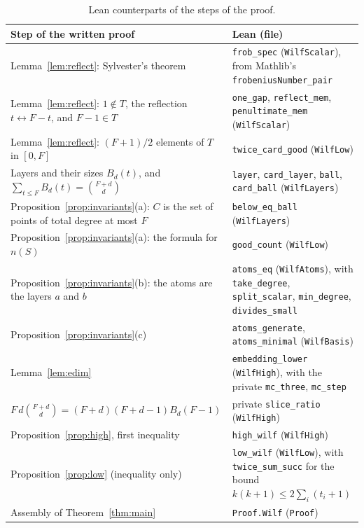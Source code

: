\documentclass[11pt]{article}
\theoremstyle{definition}
\theoremstyle{remark}
\newcommand{\Bd}[2]{B_{#1}(#2)}
\begin{document}
{\begin{table}[ht]
\centering\footnotesize
\renewcommand{\arraystretch}{1.18}
\begin{tabular}{@{}>{\raggedright\arraybackslash}p{}>{\raggedright\arraybackslash}p{}@{}}
\hline
Step of the written proof & Lean (file) \\
\hline
Lemma~\ref{lem:reflect}: Sylvester's theorem &
\texttt{frob\_spec} (\texttt{WilfScalar}), from Mathlib's
\texttt{frobeniusNumber\_pair} \\
Lemma~\ref{lem:reflect}: $1\notin T$, the reflection $t\leftrightarrow F-t$,
and $F-1\in T$ &
\texttt{one\_gap}, \texttt{reflect\_mem}, \texttt{penultimate\_mem}
(\texttt{WilfScalar}) \\
Lemma~\ref{lem:reflect}: $(F+1)/2$ elements of $T$ in $[0,F]$ &
\texttt{twice\_card\_good} (\texttt{WilfLow}) \\
Layers and their sizes $\Bd{d}{t}$, and $\sum_{t\le F}\Bd{d}{t}=\binom{F+d}{d}$ &
\texttt{layer}, \texttt{card\_layer}, \texttt{ball}, \texttt{card\_ball}
(\texttt{WilfLayers}) \\
Proposition~\ref{prop:invariants}(a): $C$ is the set of points of total degree
at most $F$ & \texttt{below\_eq\_ball} (\texttt{WilfLayers}) \\
Proposition~\ref{prop:invariants}(a): the formula for $n(S)$ &
\texttt{good\_count} (\texttt{WilfLow}) \\
Proposition~\ref{prop:invariants}(b): the atoms are the layers $a$ and $b$ &
\texttt{atoms\_eq} (\texttt{WilfAtoms}), with \texttt{take\_degree},
\texttt{split\_scalar}, \texttt{min\_degree}, \texttt{divides\_small} \\
Proposition~\ref{prop:invariants}(c) &
\texttt{atoms\_generate}, \texttt{atoms\_minimal} (\texttt{WilfBasis}) \\
Lemma~\ref{lem:edim} &
\texttt{embedding\_lower} (\texttt{WilfHigh}), with the private
\texttt{mc\_three}, \texttt{mc\_step} \\
$F\,d\binom{F+d}{d}=(F+d)(F+d-1)\Bd{d}{F-1}$ &
private \texttt{slice\_ratio} (\texttt{WilfHigh}) \\
Proposition~\ref{prop:high}, first inequality &
\texttt{high\_wilf} (\texttt{WilfHigh}) \\
Proposition~\ref{prop:low} (inequality only) &
\texttt{low\_wilf} (\texttt{WilfLow}), with \texttt{twice\_sum\_succ} for the
bound $k(k+1)\le 2\sum_i(t_i+1)$ \\
Assembly of Theorem~\ref{thm:main} &
\texttt{Proof.Wilf} (\texttt{Proof}) \\
\hline
\end{tabular}
\caption{Lean counterparts of the steps of the proof.}
\label{tab:lean}
\end{table}

}
\end{document}
